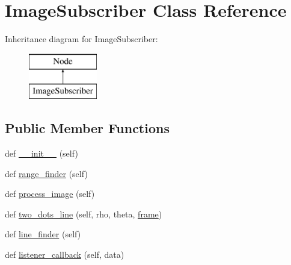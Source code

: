 \hypertarget{classtoxic__vision_1_1lane__detector_1_1ImageSubscriber}{}\section{Image\+Subscriber Class Reference}
\label{classtoxic__vision_1_1lane__detector_1_1ImageSubscriber}
Inheritance diagram for Image\+Subscriber\+:\begin{figure}[H]
\begin{center}
\leavevmode
\includegraphics[height=2.000000cm]{d8/d32/classtoxic__vision_1_1lane__detector_1_1ImageSubscriber}
\end{center}
\end{figure}
\subsection*{Public Member Functions}
\begin{DoxyCompactItemize}
\item 
def \mbox{\hyperlink{classtoxic__vision_1_1lane__detector_1_1ImageSubscriber_ae64f0875afe3067b97ba370b354b9213}{\+\_\+\+\_\+init\+\_\+\+\_\+}} (self)
\item 
def \mbox{\hyperlink{classtoxic__vision_1_1lane__detector_1_1ImageSubscriber_a876735be946e8770790a53a398cbab17}{range\+\_\+finder}} (self)
\item 
def \mbox{\hyperlink{classtoxic__vision_1_1lane__detector_1_1ImageSubscriber_a69f776519af775d0e6b8ef2bf9b2a37f}{process\+\_\+image}} (self)
\item 
def \mbox{\hyperlink{classtoxic__vision_1_1lane__detector_1_1ImageSubscriber_aa29031ea99aa06784e3755c54ba91edd}{two\+\_\+dots\+\_\+line}} (self, rho, theta, \mbox{\hyperlink{namespacetoxic__vision_1_1lane__detector_a9c845a56c4d49b65dea74d4e4f9df6d1}{frame}})
\item 
def \mbox{\hyperlink{classtoxic__vision_1_1lane__detector_1_1ImageSubscriber_ad3a1feb0c65612f560e670f5f064de28}{line\+\_\+finder}} (self)
\item 
def \mbox{\hyperlink{classtoxic__vision_1_1lane__detector_1_1ImageSubscriber_a23dd9943cb7cb7be2a6e7022a85a1684}{listener\+\_\+callback}} (self, data)
\end{DoxyCompactItemize}
